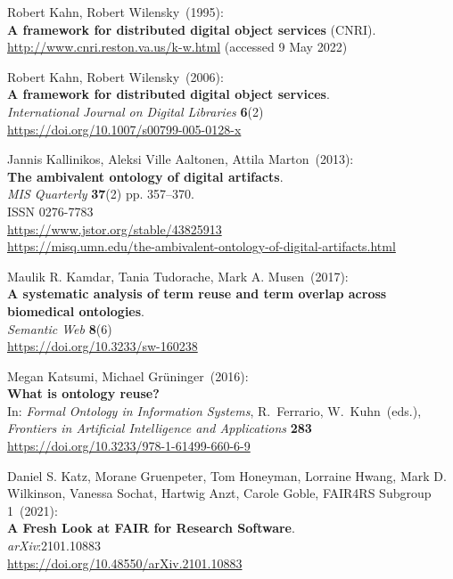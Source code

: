 \begin{thebibliography}{9}
Robert Kahn, Robert Wilensky~(1995): \\
\textbf{A framework for distributed digital object services} (CNRI).\\
\url{http://www.cnri.reston.va.us/k-w.html} (accessed 9 May 2022)


Robert Kahn, Robert Wilensky~(2006): \\
\textbf{A framework for distributed digital object services}.\\
\emph{International Journal on Digital Libraries} \textbf{6}(2)\\
\url{https://doi.org/10.1007/s00799-005-0128-x}

Jannis Kallinikos, Aleksi Ville Aaltonen, Attila Marton~(2013): \\
\textbf{The ambivalent ontology of digital artifacts}.\\ 
\emph{MIS Quarterly} \textbf{37}(2) pp. 357--370.\\
ISSN 0276-7783\\
\url{https://www.jstor.org/stable/43825913}\\
\url{https://misq.umn.edu/the-ambivalent-ontology-of-digital-artifacts.html}

Maulik R. Kamdar, Tania Tudorache, Mark A. Musen~(2017): \\
\textbf{A systematic analysis of term reuse and term overlap across biomedical ontologies}. \\
\emph{Semantic Web} \textbf{8}(6) \\
\url{https://doi.org/10.3233/sw-160238}

Megan Katsumi, Michael Grüninger~(2016): \\
\textbf{What is ontology reuse?}\\
In: \emph{Formal Ontology in Information Systems}, R.~Ferrario, 
W.~Kuhn~(eds.),\\
\emph{Frontiers in Artificial Intelligence and Applications}
\textbf{283}\\
\url{https://doi.org/10.3233/978-1-61499-660-6-9}

Daniel S. Katz, Morane Gruenpeter, Tom Honeyman, Lorraine Hwang,
Mark D. Wilkinson, Vanessa Sochat, Hartwig Anzt, Carole Goble, FAIR4RS
Subgroup 1~(2021): \\
\textbf{A Fresh Look at FAIR for Research Software}.\\
\emph{arXiv}:2101.10883\\
\url{https://doi.org/10.48550/arXiv.2101.10883}


\end{thebibliography}
